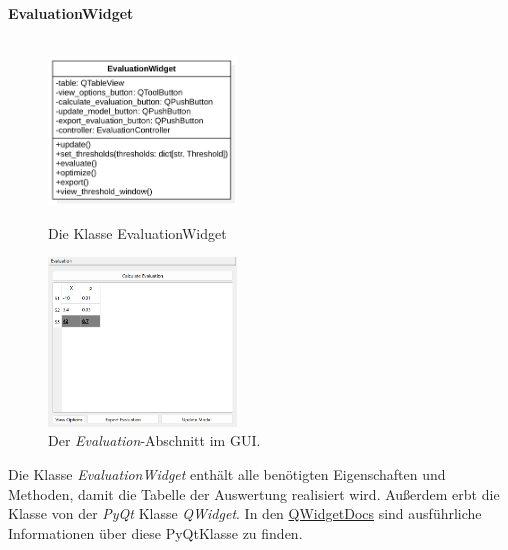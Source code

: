 \documentclass{article}
\begin{document}
\newpage
\textbf{\large{EvaluationWidget}}\\\\
\begin{figure}[H]%
    \centering
    \begin{minipage}[b]{0.4\textwidth}
        \includegraphics[width=5cm]{entwurf/Entwurf_dokument/img/klassenView/EvaluationWidget.png}
        \caption{Die Klasse EvaluationWidget}
    \end{minipage}
    \hfill
    \begin{minipage}[b]{0.4\textwidth}
        \includegraphics[width=5cm]{entwurf/Entwurf_dokument/img/Alissa/evaluationGUI.png} 
    \caption{Der \textit{Evaluation}-Abschnitt im GUI.}
    \end{minipage}
\end{figure}
Die Klasse \textit{EvaluationWidget} enthält alle benötigten Eigenschaften und Methoden, damit die Tabelle der Auswertung realisiert wird. Außerdem erbt die Klasse von der \textit{PyQt} Klasse \textit{QWidget}. In den \href{https://doc.qt.io/qt-6/qwidget.html}{QWidget\textendash Docs} sind ausführliche Informationen über diese PyQt\textendash Klasse zu finden.
\newline
\end{document}
